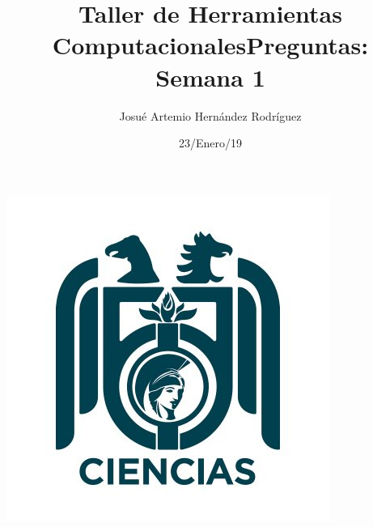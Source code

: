 \documentclass[letterpaper, 12pt, oneside]{article}%
\title{\Huge Taller de Herramientas Computacionales}
\author{Josué Artemio Hernández Rodríguez}%
\date{23/Enero/19}%
\begin{document}
\maketitle
\begin{center}%
\includegraphics[scale=.6]{3.jpg}%
\end{center}%
\newpage%

\title{\huge Preguntas: Semana 1\\}%
\end{document}
